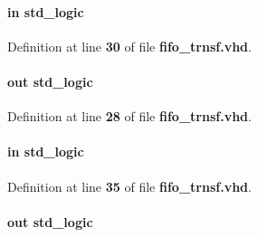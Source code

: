 \paragraph[{fifo\+\_\+rdempty}]{ {\bfseries \textcolor{keywordflow}{in}\textcolor{vhdlchar}{ }} {\bfseries \textcolor{comment}{std\+\_\+logic}\textcolor{vhdlchar}{ }} \hspace{0.3cm}{\ttfamily [Port]}}\label{classfifo__trnsf_a76cac3a261ac5629be8971f12b1a9513}


Definition at line {\bf 30} of file {\bf fifo\+\_\+trnsf.\+vhd}.

\paragraph[{fifo\+\_\+rdreq}]{ {\bfseries \textcolor{keywordflow}{out}\textcolor{vhdlchar}{ }} {\bfseries \textcolor{comment}{std\+\_\+logic}\textcolor{vhdlchar}{ }} \hspace{0.3cm}{\ttfamily [Port]}}\label{classfifo__trnsf_a33022075aee14ff50fd52519b92ff28c}


Definition at line {\bf 28} of file {\bf fifo\+\_\+trnsf.\+vhd}.

\paragraph[{fifo\+\_\+wrfull}]{ {\bfseries \textcolor{keywordflow}{in}\textcolor{vhdlchar}{ }} {\bfseries \textcolor{comment}{std\+\_\+logic}\textcolor{vhdlchar}{ }} \hspace{0.3cm}{\ttfamily [Port]}}\label{classfifo__trnsf_a59fbdb67737213369010063bac8d7540}


Definition at line {\bf 35} of file {\bf fifo\+\_\+trnsf.\+vhd}.

\paragraph[{fifo\+\_\+wrreq}]{ {\bfseries \textcolor{keywordflow}{out}\textcolor{vhdlchar}{ }} {\bfseries \textcolor{comment}{std\+\_\+logic}\textcolor{vhdlchar}{ }} \hspace{0.3cm}{\ttfamily [Port]}}\label{classfifo__trnsf_a4643410c72f0390bde3d442228a1dfd2}



